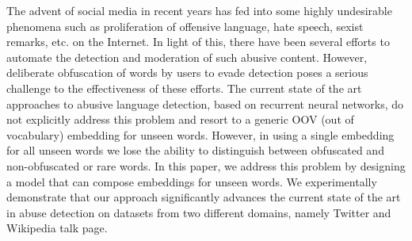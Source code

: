 The advent of social media in recent years has fed into some highly undesirable phenomena such as proliferation of offensive language, hate speech, sexist remarks, etc. on the Internet. In light of this, there have been several efforts to automate the detection and moderation of such abusive content. However, deliberate obfuscation of words by users to evade detection poses a serious challenge to the effectiveness of these efforts. The current state of the art approaches to abusive language detection, based on recurrent neural networks, do not explicitly address this problem and resort to a generic OOV (out of vocabulary) embedding for unseen words. However, in using a single embedding for all unseen words we lose the ability to distinguish between obfuscated and non-obfuscated or rare words. In this paper, we address this problem by designing a model that can compose embeddings for unseen words. We experimentally demonstrate that our approach significantly advances the current state of the art in abuse detection on datasets from two different domains, namely Twitter and Wikipedia talk page.
